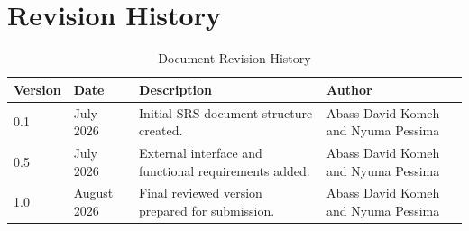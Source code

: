 
\chapter*{Revision History}

\begin{table}[H]
\centering
\caption*{Document Revision History}

\begin{tabularx}{\textwidth}{
    |p{2cm}|
    p{3cm}|
    X|
    p{3cm}|
}

\hline
\textbf{Version} &
\textbf{Date} &
\textbf{Description} &
\textbf{Author} \\

\hline
0.1 &
July 2026 &
Initial SRS document structure created. &
Abass David Komeh and Nyuma Pessima \\

\hline
0.5 &
July 2026 &
External interface and functional requirements added. &
Abass David Komeh and Nyuma Pessima \\

\hline
1.0 &
August 2026 &
Final reviewed version prepared for submission. &
Abass David Komeh and Nyuma Pessima\\

\hline

\end{tabularx}
\end{table}